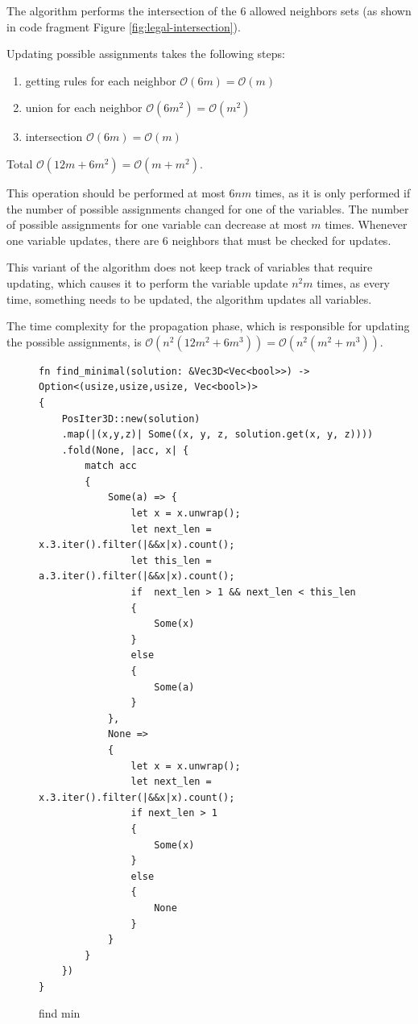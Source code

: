 \documentclass[shortabstract, english, inz]{iithesis}
\begin{document}
The algorithm performs the intersection of the 6 allowed neighbors sets (as shown in code fragment Figure \ref{fig:legal-intersection}).

Updating possible assignments takes the following steps:
\begin{enumerate}
    \item getting rules for each neighbor \(\mathcal{O}(6m) = \mathcal{O}(m)\)
    \item union for each neighbor \(\mathcal{O}(6m^2) = \mathcal{O}(m^2)\)
    \item intersection \(\mathcal{O}(6m) = \mathcal{O}(m)\)
\end{enumerate}
Total \(\mathcal{O}(12m + 6m^2) = \mathcal{O}(m+m^2)\).

This operation should be performed at most \(6nm\) times, as it is only performed if the number of possible assignments changed for one of the variables. The number of possible assignments for one variable can decrease at most \(m\) times. Whenever one variable updates, there are 6 neighbors that must be checked for updates.

This variant of the algorithm does not keep track of variables that require updating, which causes it to perform the variable update \(n^2m\) times, as every time, something needs to be updated, the algorithm updates all variables.

The time complexity for the propagation phase, which is responsible for updating the possible assignments, is \(\mathcal{O}(n^2(12m^2 + 6m^3)) = \mathcal{O}(n^2(m^2+m^3))\).

\begin{figure}
\begin{verbatim}
fn find_minimal(solution: &Vec3D<Vec<bool>>) -> Option<(usize,usize,usize, Vec<bool>)>
{
    PosIter3D::new(solution)
    .map(|(x,y,z)| Some((x, y, z, solution.get(x, y, z))))
    .fold(None, |acc, x| {
        match acc
        {
            Some(a) => {
                let x = x.unwrap();
                let next_len = x.3.iter().filter(|&&x|x).count();
                let this_len = a.3.iter().filter(|&&x|x).count();
                if  next_len > 1 && next_len < this_len
                {
                    Some(x)
                }
                else
                {
                    Some(a)
                }
            },
            None =>
            {
                let x = x.unwrap();
                let next_len = x.3.iter().filter(|&&x|x).count();
                if next_len > 1
                {
                    Some(x)
                }
                else
                {
                    None
                }
            }
        }
    })
}
\end{verbatim}
\caption{find min}
\label{fig:observe-findmin}
\end{figure}
\end{document}
